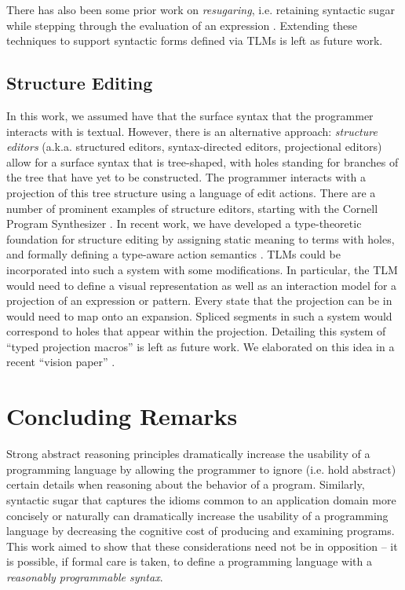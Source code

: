 There has also been some prior work on \emph{resugaring}, i.e. retaining syntactic sugar while stepping through the evaluation of an expression \cite{DBLP:conf/pldi/PombrioK14,DBLP:conf/icfp/PombrioK15}. Extending these techniques to support syntactic forms defined via TLMs is left as future work.

\subsection{Structure Editing}
In this work, we assumed have that the surface syntax that the programmer interacts with is textual. However, there is an alternative approach:  \emph{structure editors} (a.k.a. structured editors, syntax-directed editors, projectional editors)  allow for a surface syntax that is tree-shaped, with holes standing for branches of the tree that have yet to be constructed. The programmer interacts with a projection of this tree structure using a language of edit actions. There are a number of prominent examples of structure editors, starting with the Cornell Program Synthesizer \cite{teitelbaum_cornell_1981}. In recent work, we have developed a type-theoretic foundation for structure editing by assigning static meaning to terms with holes, and formally defining a type-aware action semantics \cite{DBLP:conf/popl/OmarVHAH17}. TLMs could be incorporated into such a system with some modifications. In particular, the TLM would need to define a visual representation as well as an interaction model for a projection of an expression or pattern. Every state that the projection can be in would need to map onto an expansion. Spliced segments in such a system would correspond to holes that appear within the projection. Detailing this system of ``typed projection macros'' is left as future work. We elaborated on this idea in a recent ``vision paper'' \cite{snapl17}.

\section{Concluding Remarks}
Strong abstract reasoning principles dramatically increase the usability of a programming language by allowing the programmer to ignore (i.e. hold abstract) certain details when reasoning about the behavior of a program. Similarly, syntactic sugar that captures the idioms common to an application domain more concisely or naturally can dramatically increase the usability of a programming language by decreasing the cognitive cost of producing and examining programs. This work aimed to show that these considerations need not be in opposition -- it is possible, if formal care is taken, to define a programming language with a \emph{reasonably programmable syntax}. 

